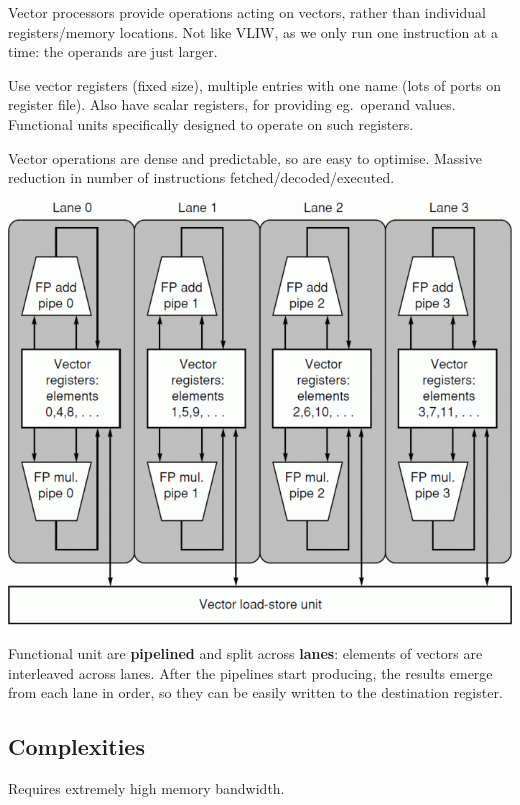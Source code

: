 \documentclass[a4paper,11pt]{article}
\begin{document}
{
    \begin{minipage}[t]{0.45\textwidth}
    Vector processors provide operations acting on vectors, rather than individual registers/memory locations. Not like VLIW, as we only run one instruction at a time: the operands are just larger.

    Use vector registers (fixed size), multiple entries with one name (lots of ports on register file). Also have scalar registers, for providing eg.\ operand values. Functional units specifically designed to operate on such registers.

    Vector operations are dense and predictable, so are easy to optimise. Massive reduction in number of instructions fetched/decoded/executed.
    \end{minipage}
    \hspace{5mm}
    \begin{minipage}[t]{0.5\textwidth}
    \vspace{0pt}
    \centering
    \includegraphics[width=\textwidth]{vector-lanes.png}
    \end{minipage}

    Functional unit are \textbf{pipelined} and split across \textbf{lanes}: elements of vectors are interleaved across lanes. After the pipelines start producing, the results emerge from each lane in order, so they can be easily written to the destination register.

    \subsection*{Complexities}
    {
        Requires extremely high memory bandwidth.

}}
\end{document}
